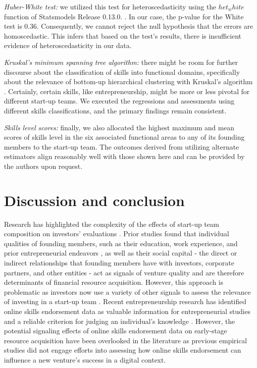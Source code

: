 \documentclass[12pt]{article}
\begin{document}
\textit{Huber-White test:} we utilized this test for heteroscedasticity using the $het_white$ function of Statsmodels Release 0.13.0. \citep{seabold2010statsmodels}. In our case, the p-value for the White test is 0.36. Consequently, we cannot reject the null hypothesis that the errors are homoscedastic. This infers that based on the test's results, there is insufficient evidence of heteroscedasticity in our data.

\textit{Kruskal's minimum spanning tree algorithm:} there might be room for further discourse about the classification of skills into functional domains, specifically about the relevance of bottom-up hierarchical clustering with Kruskal's algorithm \citep{kruskal1956shortest}. Certainly, certain skills, like entrepreneurship, might be more or less pivotal for different start-up teams. We executed the regressions and assessments using different skills classifications, and the primary findings remain consistent.

\textit{Skills level scores:} finally, we also allocated the highest maximum and mean scores of skills level in the six associated functional areas to any of its founding members to the start-up team. The outcomes derived from utilizing alternate estimators align reasonably well with those shown here and can be provided by the authors upon request.

\section{Discussion and conclusion}

Research has highlighted the complexity of the effects of start-up team composition on investors' evaluations \citep{cooper1994initial, ghassemiautomated}. Prior studies found that individual qualities of founding members, such as their education, work experience, and prior entrepreneurial endeavors \citep{shane2002network, hsu2007experienced}, as well as their social capital - the direct or indirect relationships that founding members have with investors, corporate partners, and other entities \citep{shane2002network, hsu2007experienced, huang2017resources} - act as signals of venture quality and are therefore determinants of financial resource acquisition. However, this approach is problematic as investors now use a variety of other signals to assess the relevance of investing in a start-up team \citep{banerji2019startup, mollick2014dynamics, courtney2017resolving}. Recent entrepreneurship research has identified online skills endorsement data \citep{gasiorowski2022pay, perez2016endorsement, wu2018analysis} as valuable information for entrepreneurial studies and a reliable criterion for judging an individual's knowledge \citep{rapanta2017linkedin, reese2020should, sako2020scaling}. However, the potential signaling effects of online skills endorsement data on early-stage resource acquisition have been overlooked in the literature as previous empirical studies did not engage efforts into assessing how online skills endorsement can influence a new venture's success in a digital context.
\end{document}
